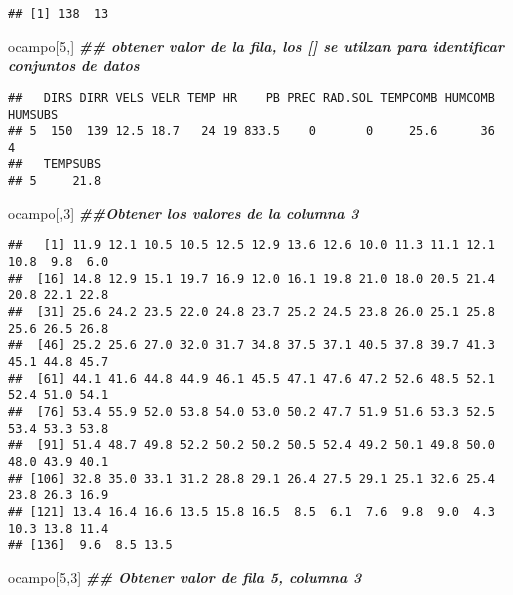 \documentclass[
]{article}
\newenvironment{Shaded}{\begin{snugshade}}{\end{snugshade}}
\newcommand{\DecValTok}[1]{\textcolor[rgb]{0.00,0.00,0.81}{#1}}
\newcommand{\DocumentationTok}[1]{\textcolor[rgb]{0.56,0.35,0.01}{\textbf{\textit{#1}}}}
\newcommand{\NormalTok}[1]{#1}
\begin{document}
\begin{verbatim}
## [1] 138  13
\end{verbatim}

\begin{Shaded}
\begin{Highlighting}[]
\NormalTok{ocampo[}\DecValTok{5}\NormalTok{,] }\DocumentationTok{\#\# obtener valor de la fila, los [] se utilzan para identificar conjuntos de datos}
\end{Highlighting}
\end{Shaded}

\begin{verbatim}
##   DIRS DIRR VELS VELR TEMP HR    PB PREC RAD.SOL TEMPCOMB HUMCOMB HUMSUBS
## 5  150  139 12.5 18.7   24 19 833.5    0       0     25.6      36       4
##   TEMPSUBS
## 5     21.8
\end{verbatim}

\begin{Shaded}
\begin{Highlighting}[]
\NormalTok{ocampo[,}\DecValTok{3}\NormalTok{] }\DocumentationTok{\#\#Obtener los valores de la columna 3}
\end{Highlighting}
\end{Shaded}

\begin{verbatim}
##   [1] 11.9 12.1 10.5 10.5 12.5 12.9 13.6 12.6 10.0 11.3 11.1 12.1 10.8  9.8  6.0
##  [16] 14.8 12.9 15.1 19.7 16.9 12.0 16.1 19.8 21.0 18.0 20.5 21.4 20.8 22.1 22.8
##  [31] 25.6 24.2 23.5 22.0 24.8 23.7 25.2 24.5 23.8 26.0 25.1 25.8 25.6 26.5 26.8
##  [46] 25.2 25.6 27.0 32.0 31.7 34.8 37.5 37.1 40.5 37.8 39.7 41.3 45.1 44.8 45.7
##  [61] 44.1 41.6 44.8 44.9 46.1 45.5 47.1 47.6 47.2 52.6 48.5 52.1 52.4 51.0 54.1
##  [76] 53.4 55.9 52.0 53.8 54.0 53.0 50.2 47.7 51.9 51.6 53.3 52.5 53.4 53.3 53.8
##  [91] 51.4 48.7 49.8 52.2 50.2 50.2 50.5 52.4 49.2 50.1 49.8 50.0 48.0 43.9 40.1
## [106] 32.8 35.0 33.1 31.2 28.8 29.1 26.4 27.5 29.1 25.1 32.6 25.4 23.8 26.3 16.9
## [121] 13.4 16.4 16.6 13.5 15.8 16.5  8.5  6.1  7.6  9.8  9.0  4.3 10.3 13.8 11.4
## [136]  9.6  8.5 13.5
\end{verbatim}

\begin{Shaded}
\begin{Highlighting}[]
\NormalTok{ocampo[}\DecValTok{5}\NormalTok{,}\DecValTok{3}\NormalTok{] }\DocumentationTok{\#\# Obtener valor de fila 5, columna 3}
\end{Highlighting}
\end{Shaded}
\end{document}
